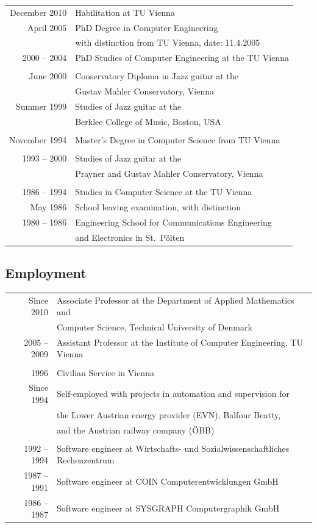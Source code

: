 \documentclass[%
    a4paper,
    11pt, %
    headinclude, footexclude,
    notitlepage,
    headsepline,
    pointlessnumbers,
    ]{scrartcl}
\begin{document}
\begin{tabular}{rl}
December 2010 & Habilitation at TU Vienna \\
April 2005   & PhD Degree in Computer Engineering\\
             & with distinction from TU Vienna, date: 11.4.2005\\
2000 -- 2004 & PhD Studies of Computer Engineering at the TU Vienna\\
\\
June 2000    & Conservatory Diploma in Jazz guitar at the\\
             & Gustav Mahler Conservatory, Vienna\\
Summer 1999  & Studies of Jazz guitar at the\\
             & Berklee College of Music, Boston, USA\\
\\
November 1994 & Master's Degree in Computer Science from TU Vienna\\
\\
1993 -- 2000 & Studies of Jazz guitar at the\\
             & Prayner and Gustav Mahler Conservatory, Vienna\\
\\
1986 -- 1994 & Studies in Computer Science at the TU Vienna\\
May 1986 & School leaving examination, with distinction\\
1980 -- 1986 & Engineering School for Communications Engineering\\
             & and Electronics in St.\ P\"olten\\
\end{tabular}

\subsection*{Employment}
\begin{tabular}{rl}
Since 2010    & Associate Professor at the Department of Applied Mathematics and\\
             & Computer Science, Technical University of Denmark\\
2005 -- 2009 & Assistant Professor at the Institute of Computer Engineering, TU Vienna\\
\\
1996         & Civilian Service in Vienna\\
Since 1994   & Self-employed with projects in automation and supervision for\\
             & the Lower Austrian energy provider (EVN), Balfour Beatty,\\
             & and the Austrian railway company (\"OBB)\\
\\
1992 -- 1994 & Software engineer at Wirtschafts- und Sozialwissenschaftliches Rechenzentrum\\
1987 -- 1991 & Software engineer at COIN Computerentwicklungen GmbH\\
1986 -- 1987 & Software engineer at SYSGRAPH Computergraphik GmbH\\
\end{tabular}
\end{document}
